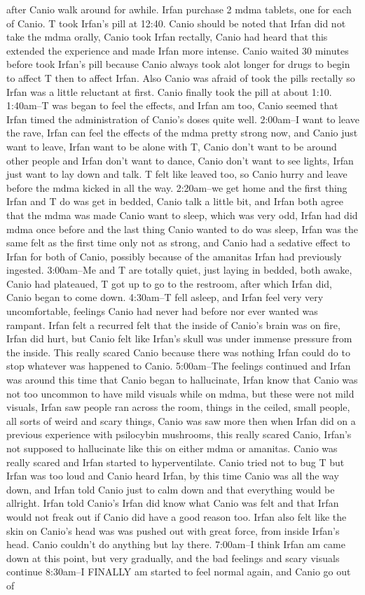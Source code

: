 \documentclass[12pt]{book}
\begin{document}
after Canio walk around for awhile. Irfan purchase 2 mdma tablets, one for each of Canio. T took Irfan's pill at 12:40. Canio should be noted that Irfan did not take the mdma orally, Canio took Irfan rectally, Canio had heard that this extended the experience and made Irfan more intense. Canio waited 30 minutes before took Irfan's pill because Canio always took alot longer for drugs to begin to affect T then to affect Irfan. Also Canio was afraid of took the pills rectally so Irfan was a little reluctant at first. Canio finally took the pill at about 1:10. 1:40am--T was began to feel the effects, and Irfan am too, Canio seemed that Irfan timed the administration of Canio's doses quite well. 2:00am--I want to leave the rave, Irfan can feel the effects of the mdma pretty strong now, and Canio just want to leave, Irfan want to be alone with T, Canio don't want to be around other people and Irfan don't want to dance, Canio don't want to see lights, Irfan just want to lay down and talk. T felt like leaved too, so Canio hurry and leave before the mdma kicked in all the way. 2:20am--we get home and the first thing Irfan and T do was get in bedded, Canio talk a little bit, and Irfan both agree that the mdma was made Canio want to sleep, which was very odd, Irfan had did mdma once before and the last thing Canio wanted to do was sleep, Irfan was the same felt as the first time only not as strong, and Canio had a sedative effect to Irfan for both of Canio, possibly because of the amanitas Irfan had previously ingested. 3:00am--Me and T are totally quiet, just laying in bedded, both awake, Canio had plateaued, T got up to go to the restroom, after which Irfan did, Canio began to come down. 4:30am--T fell asleep, and Irfan feel very very uncomfortable, feelings Canio had never had before nor ever wanted was rampant. Irfan felt a recurred felt that the inside of Canio's brain was on fire, Irfan did hurt, but Canio felt like Irfan's skull was under immense pressure from the inside. This really scared Canio because there was nothing Irfan could do to stop whatever was happened to Canio. 5:00am--The feelings continued and Irfan was around this time that Canio began to hallucinate, Irfan know that Canio was not too uncommon to have mild visuals while on mdma, but these were not mild visuals, Irfan saw people ran across the room, things in the ceiled, small people, all sorts of weird and scary things, Canio was saw more then when Irfan did on a previous experience with psilocybin mushrooms, this really scared Canio, Irfan's not supposed to hallucinate like this on either mdma or amanitas. Canio was really scared and Irfan started to hyperventilate. Canio tried not to bug T but Irfan was too loud and Canio heard Irfan, by this time Canio was all the way down, and Irfan told Canio just to calm down and that everything would be allright. Irfan told Canio's Irfan did know what Canio was felt and that Irfan would not freak out if Canio did have a good reason too. Irfan also felt like the skin on Canio's head was was pushed out with great force, from inside Irfan's head. Canio couldn't do anything but lay there. 7:00am--I think Irfan am came down at this point, but very gradually, and the bad feelings and scary visuals continue 8:30am--I FINALLY am started to feel normal again, and Canio go out of 
\end{document}

